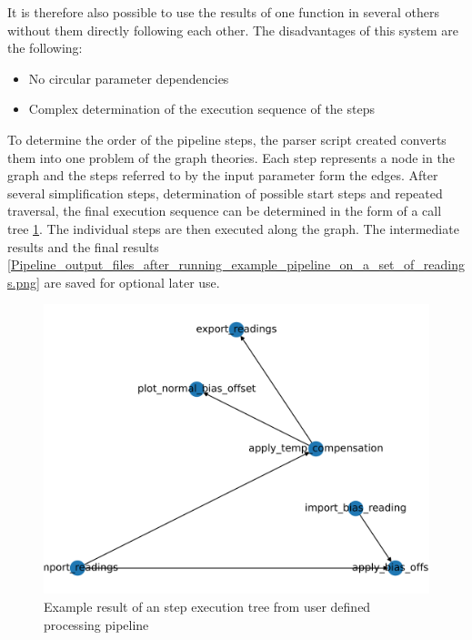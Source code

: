 It is therefore also possible to use the results of one function in
several others without them directly following each other. The
disadvantages of this system are the following:

\begin{itemize}
\tightlist
\item
  No circular parameter dependencies
\item
  Complex determination of the execution sequence of the steps
\end{itemize}

To determine the order of the pipeline steps, the parser script created
converts them into one problem of the graph theories. Each step
represents a node in the graph and the steps referred to by the input
parameter form the edges. After several simplification steps,
determination of possible start steps and repeated traversal, the final
execution sequence can be determined in the form of a call tree
\ref{Example_result_of_an_step_execution_tree_from_user_defined_processing_pipeline.png}.
The individual steps are then executed along the graph. The intermediate
results and the final results
\ref{Pipeline_output_files_after_running_example_pipeline_on_a_set_of_readings.png}
are saved for optional later use.

\begin{figure}
\centering
\includegraphics{./generated_images/border_Example_result_of_an_step_execution_tree_from_user_defined_processing_pipeline.png}
\caption{Example result of an step execution tree from user defined
processing pipeline
\label{Example_result_of_an_step_execution_tree_from_user_defined_processing_pipeline.png}}
\end{figure}

